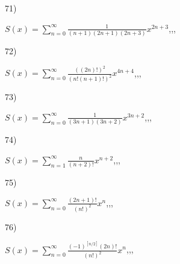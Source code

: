 \documentclass[11pt, ukrainian]{article}
\begin{document}
\par
\vspace{0.9cm}
71) \space 
{%
{$S(x)=\sum\limits_{n=0}^{\infty}{\frac{1}{(n+1)(2n+1)(2n+3)}}{x^{{2n+3}}}$},,, \par \smallskip  
}
\par
\vspace{0.9cm}
72) \space 
{%
{$S(x)=\sum\limits_{n=0}^{\infty}{\frac{((2n)!)^2}{(n!(n+1)!)^2}}{x^{{4n+4}}}$},,, \par \smallskip  
}
\par
\newpage
73) \space 
{%
{$S(x)=\sum\limits_{n=0}^{\infty}{\frac{1}{(3n+1)(3n+2)}}{x^{{3n+2}}}$},,, \par \smallskip  
}
\par
\vspace{0.9cm}
74) \space 
{%
{$S(x)=\sum\limits_{n=1}^{\infty}{\frac{n}{(n+2)!}}{x^{{n+2}}}$},,, \par \smallskip  
}
\par
\vspace{0.9cm}
75) \space 
{%
{$S(x)=\sum\limits_{n=0}^{\infty}{\frac{(2n+1)!}{(n!)^2}}{x^{n}}$},,, \par \smallskip  
}
\par
\vspace{0.9cm}
76) \space 
{%
{$S(x)=\sum\limits_{n=0}^{\infty}{\frac{{(-1)^{[n/2]}}(2n)!}{(n!)^2}}{x^{n}}$},,, \par \smallskip  
}
\end{document}
